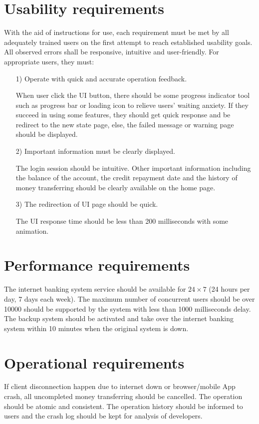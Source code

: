 \documentclass{scrreprt}
\begin{document}
\section{Usability requirements}
With the aid of instructions for use, each requirement must be met by all adequately trained users on the first attempt to reach established usability goals. All observed errors shall be responsive, intuitive and user-friendly. For appropriate users, they must:
\begin{itemize}
    \item [1)] Operate with quick and accurate operation feedback.
    
    When user click the UI button, there should be some progress indicator tool such as progress bar or loading icon to relieve users' waiting anxiety. If they succeed in using some features, they should get quick response and be redirect to the new state page, else, the failed message or warning page should be displayed.

    \item [2)] Important information must be clearly displayed.
    
    The login session should be intuitive. Other important information including the balance of the account, the credit repayment date and the history of money transferring should be clearly available on the home page. 

    \item [3)] The redirection of UI page should be quick.
    
    The UI response time should be less than 200 milliseconds with some animation. 


\end{itemize} 
\section{Performance requirements}
The internet banking system service should be available for $24\times 7$ (24 hours per day, 7 days each week). The maximum number of concurrent users should be over 10000 should be supported by the system with less than 1000 milliseconds delay. The backup system should be activated and take over the internet banking system within 10 minutes when the original system is down.

\section{Operational requirements}
If client disconnection happen due to internet down or browser/mobile App crash, all uncompleted money transferring should be cancelled. The operation should be atomic and consistent. The operation history should be informed to users and the crash log should be kept for analysis of developers.
\end{document}
